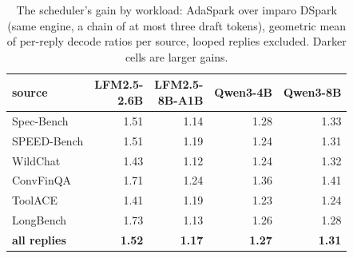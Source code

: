 \begin{table}[t]
\centering\small
\caption{The scheduler's gain by workload: AdaSpark over imparo DSpark (same engine, a chain of at most three draft tokens), geometric mean of per-reply decode ratios per source, looped replies excluded. Darker cells are larger gains.}
\label{tab:sources}
\setlength{\tabcolsep}{4pt}
\begin{tabular}{lrrrr}
\toprule
\rowcolor{head}\textbf{source} & \makecell[r]{\bfseries LFM2.5-\\2.6B} & \makecell[r]{\bfseries LFM2.5-\\8B-A1B} & \textbf{Qwen3-4B} & \textbf{Qwen3-8B} \\
\midrule
Spec-Bench & \cellcolor{c1!27}1.51 & \cellcolor{c1!7}1.14 & \cellcolor{c1!14}1.28 & \cellcolor{c1!17}1.33 \\
SPEED-Bench & \cellcolor{c1!27}1.51 & \cellcolor{c1!9}1.19 & \cellcolor{c1!12}1.24 & \cellcolor{c1!16}1.31 \\
WildChat & \cellcolor{c1!23}1.43 & \cellcolor{c1!6}1.12 & \cellcolor{c1!12}1.24 & \cellcolor{c1!17}1.32 \\
ConvFinQA & \cellcolor{c1!38}1.71 & \cellcolor{c1!12}1.24 & \cellcolor{c1!19}1.36 & \cellcolor{c1!21}1.41 \\
ToolACE & \cellcolor{c1!22}1.41 & \cellcolor{c1!9}1.19 & \cellcolor{c1!12}1.23 & \cellcolor{c1!12}1.24 \\
LongBench & \cellcolor{c1!40}1.73 & \cellcolor{c1!6}1.13 & \cellcolor{c1!13}1.26 & \cellcolor{c1!15}1.28 \\
\rowcolor{tint1}\textbf{all replies} & \textbf{1.52} & \textbf{1.17} & \textbf{1.27} & \textbf{1.31} \\
\bottomrule
\end{tabular}
\end{table}
